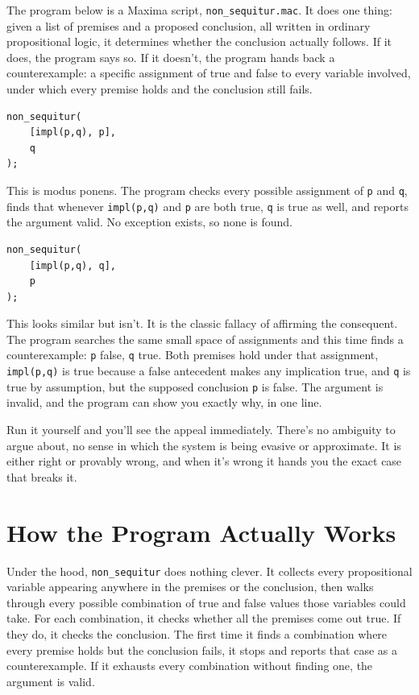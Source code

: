 The program below is a Maxima script, \texttt{non\_sequitur.mac}. It does one thing: given a list of premises and a proposed conclusion, all written in ordinary propositional logic, it determines whether the conclusion actually follows. If it does, the program says so. If it doesn't, the program hands back a counterexample: a specific assignment of true and false to every variable involved, under which every premise holds and the conclusion still fails.

\begin{Verbatim}[fontsize=\small, frame=single, xleftmargin=1em, xrightmargin=1em]
non_sequitur(
    [impl(p,q), p],
    q
);
\end{Verbatim}

This is modus ponens. The program checks every possible assignment of \texttt{p} and \texttt{q}, finds that whenever \texttt{impl(p,q)} and \texttt{p} are both true, \texttt{q} is true as well, and reports the argument valid. No exception exists, so none is found.

\begin{Verbatim}[fontsize=\small, frame=single, xleftmargin=1em, xrightmargin=1em]
non_sequitur(
    [impl(p,q), q],
    p
);
\end{Verbatim}

This looks similar but isn't. It is the classic fallacy of affirming the consequent. The program searches the same small space of assignments and this time finds a counterexample: \texttt{p} false, \texttt{q} true. Both premises hold under that assignment, \texttt{impl(p,q)} is true because a false antecedent makes any implication true, and \texttt{q} is true by assumption, but the supposed conclusion \texttt{p} is false. The argument is invalid, and the program can show you exactly why, in one line.

Run it yourself and you'll see the appeal immediately. There's no ambiguity to argue about, no sense in which the system is being evasive or approximate. It is either right or provably wrong, and when it's wrong it hands you the exact case that breaks it.

\section*{How the Program Actually Works}

Under the hood, \texttt{non\_sequitur} does nothing clever. It collects every propositional variable appearing anywhere in the premises or the conclusion, then walks through every possible combination of true and false values those variables could take. For each combination, it checks whether all the premises come out true. If they do, it checks the conclusion. The first time it finds a combination where every premise holds but the conclusion fails, it stops and reports that case as a counterexample. If it exhausts every combination without finding one, the argument is valid.

